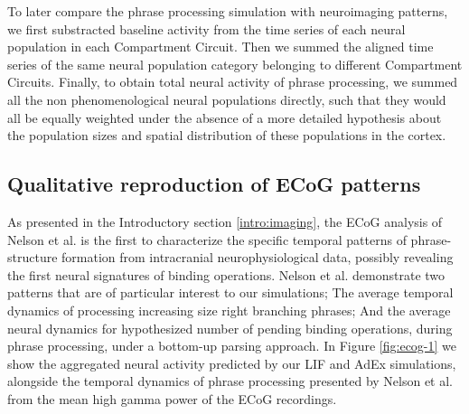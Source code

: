 \documentclass[10pt]{article}
\begin{document}
To later compare the phrase processing simulation with neuroimaging patterns, we first substracted baseline activity from the time series of each neural population in each Compartment Circuit.
Then we summed the aligned time series of the same neural population category belonging to different Compartment Circuits.
Finally, to obtain total neural activity of phrase processing, we summed all the non phenomenological neural populations directly, such that they would all be equally weighted under the absence of a more detailed hypothesis about the population sizes and spatial distribution of these populations in the cortex.


\subsection{Qualitative reproduction of ECoG patterns}
{\label{sec:ecog-patterns}}


As presented in the Introductory section \ref{intro:imaging}, the ECoG analysis of Nelson et al.\cite{Nelson_2017} is the first to characterize the specific temporal patterns of phrase-structure formation from intracranial neurophysiological data, possibly revealing the first neural signatures of binding operations.
Nelson et al. demonstrate two patterns that are of particular interest to our simulations; The average temporal dynamics of processing increasing size right branching phrases; And the average neural dynamics for hypothesized number of pending binding operations, during phrase processing, under a bottom-up parsing approach.
In Figure \ref{fig:ecog-1} we show the aggregated neural activity predicted by our LIF and AdEx simulations, alongside the temporal dynamics of phrase processing presented by Nelson et al. from the mean high gamma power of the ECoG recordings.
\end{document}
